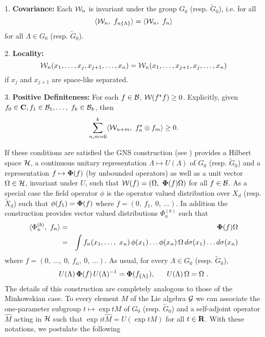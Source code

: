\documentclass[a4paper,a4paper]{article}
\def\bC{{\bf C}}
\def\bR{{\bf R}}
\def\BB{{\cal B}}
\def\GG{{\cal G}}
\def\HH{{\cal H}}
\def\WW{{\cal W}}
\def\wh{\widehat}
\def\wt{\widetilde}
\def\Rep{\mbox{\boldmath $\Phi$}}
\begin{document}
\begin{description}
\item{1.} {\bf Covariance:} Each ${\cal W}_{n}$ is invariant under
the group $G_0$ (resp. $\wt G_0$), i.e. for all
\begin{equation}
\langle {\cal W}_{n},\ f_{n\{\Lambda\}}\rangle =
\langle {\cal W}_{n},\ f_{n} \rangle
\label{4.3}
\end{equation}
for all $\Lambda \in G_0$ (resp. $\wt G_0$).

\item{2.} {\bf Locality:}
\begin{equation}
{\cal W}_{n}({x_{1}},\ldots,x_{j},x_{j+1},\ldots,x_{n})
={\cal W}_{n}({x_{1}},\ldots,x_{j+1},x_{j},\ldots,x_{n})
\label{4.4}\end{equation}
if $x_{j}$ and $x_{j+1}$ are space-like separated.

\item{3.} {\bf Positive Definiteness:} For each $f \in \BB$,
$\WW(f^\star f) \ge 0$. Explicitly,
given $f_{0} \in {{\bC}},
f_{1} \in \BB_1,\ldots,$
$f_{k} \in \BB_k$,
then
\begin{equation}
\sum_{n,m=0}^{k}\langle
{\cal W}_{n+m},\ f_{n}^\star\otimes f_{m}\rangle\geq 0.
\label{4.5}\end{equation}
\end{description}

If these conditions are satisfied the GNS construction (see
\cite{Bo,J}) provides a Hilbert space $\HH$, a continuous unitary
representation $\Lambda \mapsto U(\Lambda)$ of $G_0$ (resp. $\wt
G_0$) and a representation $f \mapsto \Rep({f})$ (by unbounded
operators) as well as a unit vector $\Omega \in \HH$, invariant
under $U$, such that $\WW(f) = (\Omega,\ \Rep(f)\Omega)$ for all
$f \in \BB$. As a special case the field operator $\phi$ is the
operator valued distribution over $X_d$ (resp. $\wt X_d$) such
that $\phi(f_1) = \Rep(f)$ where $f = (0,\ f_1,\ 0,\ \dots)$. In
addition the construction provides vector valued distributions
$\Phi_n^{(b)}$ such that
\begin{eqnarray}
\langle \Phi_n^{(b)},\ f_n \rangle &=&
\Rep(f)\Omega\nonumber\\
&=& \int f_n(x_1,\ldots,\ x_n)\,\phi(x_1)\ldots\phi(x_n)\,\Omega\,
d\sigma(x_1)\ldots d\sigma(x_n)
\label{4.6}\end{eqnarray}
where $f = (0,\ \ldots,\ 0,\ f_n,\ 0,\ \ldots )$. As usual, for every
$\Lambda \in G_0$ (resp. $\wt G_0$),
\begin{equation}
U(\Lambda)\,\Rep(f)\,U(\Lambda)^{-1} = \Rep(f_{\{\Lambda\}}),\ \ \ \ \
U(\Lambda)\,\Omega = \Omega\ .
\label{4.7}\end{equation}
The details of this construction are completely analogous to those
of the Min\-kow\-skian case. To every element $M$ of the Lie algebra $\GG$
we can associate the one-parameter subgroup $t \mapsto \exp tM$ of
$G_0$ (resp. $\wt G_0$) and a self-adjoint operator $\wh M$ acting in
$\HH$ such that $\exp it\wh M = U(\exp tM)$ for all $t \in \bR$.
With these notations, we postulate the following
\end{document}
